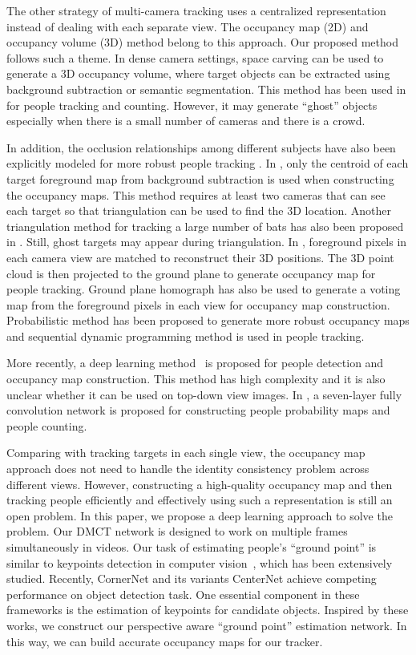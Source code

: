 \documentclass{article}
\begin{document}
The other strategy of multi-camera tracking uses a centralized
representation instead of dealing with each separate view.
The occupancy
map (2D) and occupancy volume (3D) method belong to this approach. Our proposed method follows such a theme.
In dense camera settings, space carving \cite{count}
can be used to generate a 3D occupancy volume, where target objects can be extracted using background
subtraction or semantic segmentation. This method has been used in \cite{count} for people tracking and counting.
However, it
may generate ``ghost'' objects especially when there is a small number of cameras and there is a crowd.

In addition, the occlusion relationships among different subjects have also been explicitly modeled
for more robust people tracking \cite{occ}.
In \cite{centroid}, only the centroid of each target foreground map from background subtraction
is used when constructing the
occupancy maps. This method requires at least two cameras that can see each target so that triangulation can be used to
find the 3D location.
Another triangulation method for tracking a large number of bats has also been proposed in \cite{margrit}.
 Still, ghost targets may appear during triangulation.
In \cite{larry}, foreground pixels in each
camera view are matched to reconstruct their 3D positions. The 3D point cloud is then projected to the ground plane
to generate occupancy map
for people
tracking. Ground plane homograph \cite{ucf} has also be used to generate a voting map from the foreground pixels in each view
for occupancy map construction. Probabilistic method \cite{epfl1} has been proposed to generate more robust occupancy maps
and sequential dynamic programming method is used in people tracking.

More recently, a deep learning method~\cite{epfl2} is proposed for people detection and occupancy map construction. 
This method has high
complexity and it is also unclear whether it can be used on top-down view images. In \cite{count19}, a seven-layer
fully convolution network is proposed for constructing people probability maps and people counting.


Comparing with tracking targets in each single view, the occupancy map approach does not need to handle the identity consistency problem
across different views. However, constructing a high-quality occupancy map and then tracking people efficiently and effectively using such a
representation
is still
an open problem. In this paper, we propose a deep learning approach to solve the problem.
Our DMCT network is designed to work on multiple frames simultaneously in videos.
Our task of estimating people's ``ground point'' is similar to keypoints detection in computer vision~\cite{alahi2012freak,leutenegger2011brisk}, which has been extensively studied.
Recently, CornerNet \cite{law2018cornernet} and its variants CenterNet \cite{duan2019centernet,zhou2019objects} achieve competing performance on object detection task.
One essential component in these frameworks is the estimation of keypoints for candidate objects.
Inspired by these works, we construct our perspective aware ``ground point'' estimation network.
In this way, we can build accurate occupancy maps for our tracker.
\end{document}
